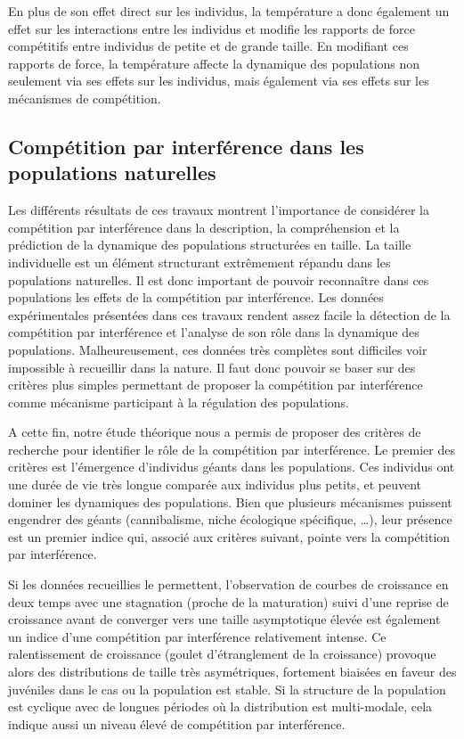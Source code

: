 En plus de son effet direct sur les individus, la température a donc également
un effet sur les interactions entre les individus et modifie les rapports de force
compétitifs entre individus de petite et de grande taille. En modifiant ces
rapports de force, la température affecte la dynamique des populations non
seulement via ses effets sur les individus, mais également via ses effets sur
les mécanismes de compétition.

\subsection{Compétition par interférence dans les populations naturelles}

Les différents résultats de ces travaux montrent l'importance de considérer la
compétition par interférence dans la description, la compréhension et la
prédiction de la dynamique des populations structurées en taille. La taille
individuelle est un élément structurant extrêmement répandu dans les populations
naturelles. Il est donc important de pouvoir reconnaître dans ces populations
les effets de la compétition par interférence. Les données expérimentales
présentées dans ces travaux rendent assez facile la détection de la compétition
par interférence et l'analyse de son rôle dans la dynamique des populations.
Malheureusement, ces données très complètes sont difficiles voir impossible à
recueillir dans la nature. Il faut donc pouvoir se baser sur des critères plus
simples permettant de proposer la compétition par interférence comme mécanisme
participant à la régulation des populations.

A cette fin, notre étude théorique nous a permis de proposer des critères de
recherche pour identifier le rôle de la compétition par interférence. Le premier
des critères est l'émergence d'individus géants dans les populations.
Ces individus ont une durée de vie très longue comparée aux individus plus
petits, et peuvent dominer les dynamiques des populations. Bien que plusieurs
mécanismes puissent engendrer des géants (cannibalisme, niche écologique
spécifique, \ldots), leur présence est un premier indice qui, associé aux
critères suivant, pointe vers la compétition par interférence.

Si les données recueillies le permettent, l'observation de courbes de croissance
en deux temps avec une stagnation (proche de la maturation) suivi d'une reprise
de croissance avant de converger vers une taille asymptotique élevée est
également un indice d'une compétition par interférence relativement intense. Ce
ralentissement de croissance (goulet d'étranglement de la croissance) provoque
alors des distributions de taille très asymétriques, fortement biaisées en
faveur des juvéniles dans le cas ou la population est stable. Si la structure de
la population est cyclique avec de longues périodes où la distribution est
multi-modale, cela indique aussi un niveau élevé de compétition par
interférence.

